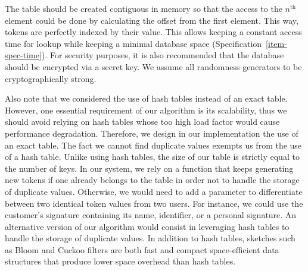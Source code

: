 \documentclass{llncs}
\newcounter{prob}
\begin{document}
The table should be created contiguous in memory so that the access to the $n^\text{th}$ element could be done by calculating the offset from the first element. This way, tokens are perfectly indexed by their value. This allows keeping a constant access time for lookup while keeping a minimal database space (Specification~\ref{item-spec-time}). For security purposes, it is also recommended that the database should be encrypted via a secret key. We assume all randomness generators to be cryptographically strong.

Also note that we considered the use of hash tables instead of an exact table. However, one essential requirement of our algorithm is its scalability, thus we should avoid relying on hash tables whose too high load factor would cause performance degradation. Therefore, we design in our implementation the use of an exact table. The fact we cannot find duplicate values exempts us from the use of a hash table. Unlike using hash tables, the size of our table is strictly equal to the number of keys. In our system, we rely on a function that keeps generating new tokens if one already belongs to the table in order not to handle the storage of duplicate values. Otherwise, we would need to add a parameter to differentiate between two identical token values from two users. For instance, we could use the customer's signature containing its name, identifier, or a personal signature. An alternative version of our algorithm would consist in leveraging hash tables to handle the storage of duplicate values. In addition to hash tables, sketches such as Bloom and Cuckoo filters are both fast and compact space-efficient data structures that produce lower space overhead than hash tables.
\end{document}
